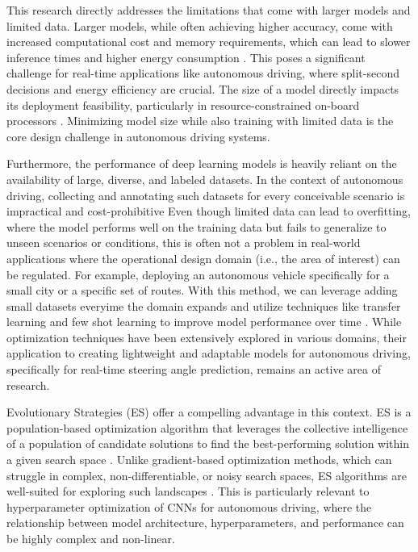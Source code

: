 \documentclass[conference]{IEEEtran}
\begin{document}
This research directly addresses the limitations that come with larger models and limited data. Larger models, while often achieving higher accuracy, come with increased computational cost and memory requirements, which can lead to slower inference times and higher energy consumption \cite{self_drive_latency_and_model_size_drawbacks}. This poses a significant challenge for real-time applications like autonomous driving, where split-second decisions and energy efficiency are crucial. The size of a model directly impacts its deployment feasibility, particularly in resource-constrained on-board processors \cite{MobileNET_size_and_speed}. Minimizing model size while also training with limited data is the core design challenge in autonomous driving systems.

Furthermore, the performance of deep learning models is heavily reliant on the availability of large, diverse, and labeled datasets. In the context of autonomous driving, collecting and annotating such datasets for every conceivable scenario is impractical and cost-prohibitive \cite{ImageNET_large_scale_database} Even though limited data can lead to overfitting, where the model performs well on the training data but fails to generalize to unseen scenarios or conditions, this is often not a problem in real-world applications where the operational design domain (i.e., the area of interest) can be regulated. For example, deploying an autonomous vehicle specifically for a small city or a specific set of routes. With this method, we can leverage adding small datasets everyime the domain expands and utilize techniques like transfer learning and few shot learning to improve model performance over time \cite{few_shot_learning}. While optimization techniques have been extensively explored in various domains, their application to creating lightweight and adaptable models for autonomous driving, specifically for real-time steering angle prediction, remains an active area of research.

Evolutionary Strategies (ES) offer a compelling advantage in this context. ES is a population-based optimization algorithm that leverages the collective intelligence of a population of candidate solutions to find the best-performing solution within a given search space \cite{ES_introduction}. Unlike gradient-based optimization methods, which can struggle in complex, non-differentiable, or noisy search spaces, ES algorithms are well-suited for exploring such landscapes \cite{ES_scalable}. This is particularly relevant to hyperparameter optimization of CNNs for autonomous driving, where the relationship between model architecture, hyperparameters, and performance can be highly complex and non-linear.
\end{document}
